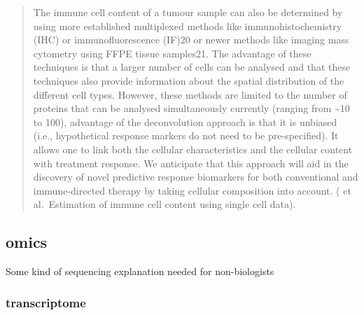\documentclass[12pt,]{book}
\theoremstyle{definition}
\theoremstyle{definition}
\theoremstyle{definition}
\theoremstyle{remark}
\begin{document}
\begin{quote}
The immune cell content of a tumour sample can also be determined by
using more established multiplexed methods like immunohistochemistry
(IHC) or immunofluorescence (IF)20 or newer methods like imaging mass
cytometry using FFPE tissue samples21. The advantage of these techniques
is that a larger number of cells can be analysed and that these
techniques also provide information about the spatial distribution of
the different cell types. However, these methods are limited to the
number of proteins that can be analysed simultaneously currently
(ranging from \textasciitilde{}10 to 100), advantage of the
deconvolution approach is that it is unbiased (i.e., hypothetical
response markers do not need to be pre-specified). It allows one to link
both the cellular characteristics and the cellular content with
treatment response. We anticipate that this approach will aid in the
discovery of novel predictive response biomarkers for both conventional
and immune-directed therapy by taking cellular composition into account.
(\citet{Shelker} et al.~Estimation of immune cell content using single
cell data).
\end{quote}

\hypertarget{omics}{%
\subsection{omics}\label{omics}}

Some kind of sequencing explanation needed for non-biologists

\hypertarget{transcriptome}{%
\subsubsection{transcriptome}\label{transcriptome}}
\end{document}
